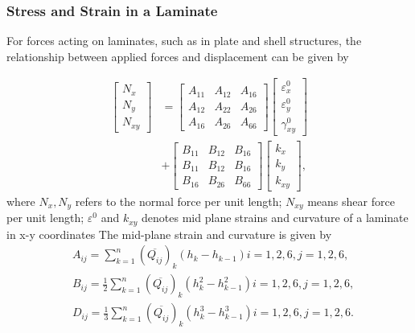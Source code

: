 \subsubsection{Stress and Strain in a Laminate}
For forces acting on laminates, such as in plate and shell
structures, the relationship between applied forces and displacement
can be given by

\begin{equation} \label{eq:force_and_moments}
	\begin{array}{ll}
	\begin{bmatrix}
		N_x \\
		N_y \\
		N_{xy}
	\end{bmatrix}
	&=
	\begin{bmatrix}
		A_{11} & A_{12} & A_{16} \\
		A_{12} & A_{22} & A_{26} \\
		A_{16} & A_{26} & A_{66} 
	\end{bmatrix}
    \begin{bmatrix}
		\varepsilon_x^0 \\
        \varepsilon_y^0 \\
		\gamma_{xy}^0
    \end{bmatrix}   \\
	&+               
	\begin{bmatrix}
		B_{11} & B_{12} & B_{16} \\
		B_{11} & B_{12} & B_{16} \\
		B_{16} & B_{26} & B_{66} 
	\end{bmatrix}
	\begin{bmatrix}
		k_x \\
		k_y \\
		k_{xy} 
	\end{bmatrix}  \textstyle{,}
	\end{array}
\end{equation}
where $N_x,N_y $ refers to the normal force per unit length;
$N_{xy}$ means shear force per unit length;
$\varepsilon^{0}$ and $k_{xy}$ denotes  mid plane strains and curvature of a laminate in x-y coordinates
The mid-plane strain and curvature is given by
\begin{equation}
    \begin{split}
	&A_{ij}=\sum_{k=1}^{n}(\overline{Q_{ij}})_k(h_k-h_{k-1})  i=1,2,6, j=1,2,6 \textstyle{,}\\
    &B_{ij}=\frac{1}{2}\sum_{k=1}^{n}(\overline{Q_{ij}})_k(h_k^2 - h_{k-1}^2)  i=1,2,6, j=1,2,6\textstyle{,}\\
    &D_{ij}=\frac{1}{3}\sum_{k=1}^{n}(\overline{Q_{ij}})_k(h_k^3 - h_{k-1}^3) i=1,2,6, j=1,2,6\textstyle{.}\\
    \end{split}
\end{equation}

